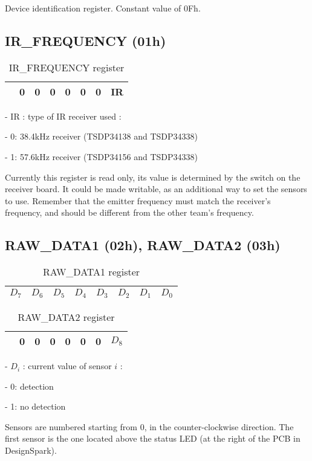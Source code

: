 \documentclass[a4paper,11pt]{article}
\begin{document}
Device identification register. Constant value of 0Fh.

\subsection{IR\_FREQUENCY (01h)}

\begin{table}[H]
\centering
\caption{IR\_FREQUENCY register}
\begin{tabularx}{\textwidth}{|Y|Y|Y|Y|Y|Y|Y|Y|}
\hline
{} & 0 & 0 & 0 & 0 & 0 & 0 & IR \\ \hline  
\end{tabularx}
\end{table}

\par - IR : type of IR receiver used :
\par \qquad - 0: 38.4kHz receiver (TSDP34138 and TSDP34338)
\par \qquad - 1: 57.6kHz receiver (TSDP34156 and TSDP34338)
\par Currently this register is read only, its value is determined by the switch on the receiver board. It could be made writable, as an additional way to set the sensors to use. Remember that the emitter frequency must match the receiver's frequency, and should be different from the other team's frequency.

\subsection{RAW\_DATA1 (02h), RAW\_DATA2 (03h)}

\begin{table}[H]
\centering
\caption{RAW\_DATA1 register}
\begin{tabularx}{\textwidth}{|Y|Y|Y|Y|Y|Y|Y|Y|}
\hline
\centering $D_7$ & $D_6$ & $D_5$ & $D_4$ & $D_3$ & $D_2$ & $D_1$ & $D_0$ \\ \hline  
\end{tabularx}
\end{table}

\begin{table}[H]
\centering
\caption{RAW\_DATA2 register}
\begin{tabularx}{\textwidth}{|Y|Y|Y|Y|Y|Y|Y|Y|}
\hline
{} & 0 & 0 & 0 & 0 & 0 & 0 & $D_8$ \\ \hline  
\end{tabularx}
\end{table}

\par - $D_i$ : current value of sensor $i$ :
\par \qquad - 0: detection
\par \qquad - 1: no detection
\par Sensors are numbered starting from 0, in the counter-clockwise direction. The first sensor is the one located above the status LED (at the right of the PCB in DesignSpark).
\end{document}
